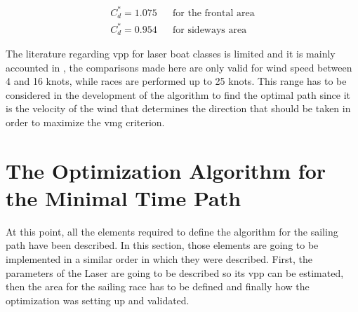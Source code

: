 \begin{subequations} \label{eq:draftMod}
 \begin{align}
  C_{d}^*= 1.075 && \text{for the frontal area} \label{eq:FrontalAreaDraft} \\
  C_{d}^*= 0.954 && \text{for sideways area} \label{eq:SideAreaDraft}
 \end{align}
\end{subequations}

\par 
The literature regarding \acrshort{vpp} for laser boat classes is limited and it is mainly accounted in \cite{day2017performance}, the comparisons made here are only valid for wind speed between  4 and 16 knots, while races are performed up to 25 knots. This range has to be considered in the development of the algorithm to find the optimal path since it is the velocity of the wind that determines the direction that should be taken in order to maximize the \acrshort{vmg} criterion. \par 

\section{The Optimization Algorithm for the Minimal Time Path}
At this point, all the elements required to define the algorithm for the sailing path have been described. In this section, those elements are going to be implemented in a similar order in which they were described. First, the parameters of the Laser are going to be described so its \acrshort{vpp} can be estimated, then the area for the sailing race has to be defined and finally how the optimization was setting up and validated. 

